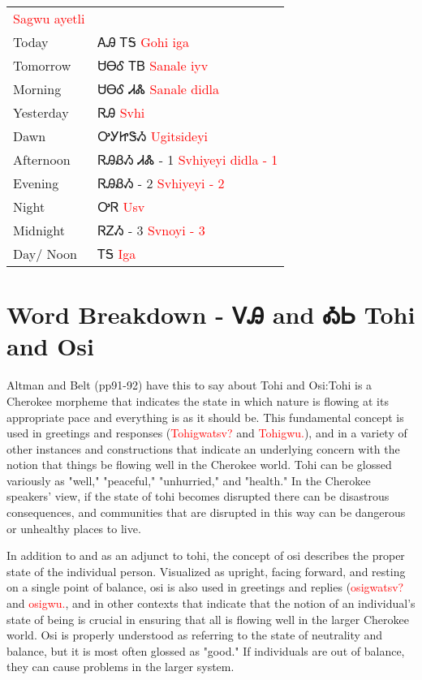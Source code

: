\begin{tabular}{p{3cm} p{11cm}}
 \newline \textcolor{red}{Sagwu ayetli}\\
Today & ᎪᎯ ᎢᎦ 
 \newline \textcolor{red}{Gohi iga}\\
Tomorrow & ᏌᎾᎴ ᎢᏴ 
 \newline \textcolor{red}{Sanale iyv}\\
Morning & ᏌᎾᎴ ᏗᏜ 
 \newline \textcolor{red}{Sanale didla}\\
Yesterday & ᏒᎯ 
 \newline \textcolor{red}{Svhi}\\
Dawn & ᎤᎩᏥᏕᏱ 
 \newline \textcolor{red}{Ugitsideyi}\\
Afternoon & ᏒᎯᏰᏱ ᏗᏜ - 1 
 \newline \textcolor{red}{Svhiyeyi didla - 1}\\
Evening & ᏒᎯᏰᏱ - 2 
 \newline \textcolor{red}{Svhiyeyi - 2}\\
Night & ᎤᏒ 
 \newline \textcolor{red}{Usv}\\
Midnight & ᏒᏃᏱ - 3 
 \newline \textcolor{red}{Svnoyi - 3}\\
Day/ Noon & ᎢᎦ 
 \newline \textcolor{red}{Iga}\\
\end{tabular}

\label{sec:wordBreakdownTohiOsi}\section{Word Breakdown - ᏙᎯ and ᎣᏏ Tohi and Osi}Altman and Belt (pp91-92) have this to say about Tohi and Osi:Tohi is a Cherokee morpheme that indicates the state in which nature is flowing at its appropriate pace and everything is as it should be. This fundamental concept is used in greetings and responses (\textcolor{red}{Tohigwatsv?} and \textcolor{red}{Tohigwu.}), and in a variety of other instances and constructions that indicate an underlying concern with the notion that things be flowing well in the Cherokee world. Tohi can be glossed variously as "well," "peaceful," "unhurried," and "health." In the Cherokee speakers' view, if the state of tohi becomes disrupted there can be disastrous consequences, and communities that are disrupted in this way can be dangerous or unhealthy places to live.

In addition to and as an adjunct to tohi, the concept of osi describes the proper state of the individual person. Visualized as upright, facing forward, and resting on a single point of balance, osi is also used in greetings and replies (\textcolor{red}{osigwatsv?} and \textcolor{red}{osigwu.}, and in other contexts that indicate that the notion of an individual’s state of being is crucial in ensuring that all is flowing well in the larger Cherokee world. Osi is properly understood as referring to the state of neutrality and balance, but it is most often glossed as "good." If individuals are out of balance, they can cause problems in the larger system.\cite{altmanBelt90-98}